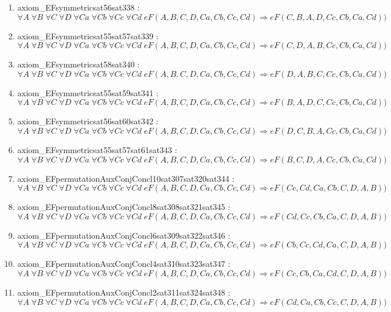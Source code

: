 \documentclass{article}
\begin{document}
\begin{enumerate}
\item axiom\_EFsymmetricsat56sat338 : $\forall A\;\forall B\;\forall C\;\forall D\;\forall Ca\;\forall Cb\;\forall Cc\;\forall Cd\;eF(A, B, C, D, Ca, Cb, Cc, Cd) \Rightarrow eF(C, B, A, D, Cc, Cb, Ca, Cd))$
\item axiom\_EFsymmetricsat55sat57sat339 : $\forall A\;\forall B\;\forall C\;\forall D\;\forall Ca\;\forall Cb\;\forall Cc\;\forall Cd\;eF(A, B, C, D, Ca, Cb, Cc, Cd) \Rightarrow eF(C, D, A, B, Cc, Cb, Ca, Cd))$
\item axiom\_EFsymmetricsat58sat340 : $\forall A\;\forall B\;\forall C\;\forall D\;\forall Ca\;\forall Cb\;\forall Cc\;\forall Cd\;eF(A, B, C, D, Ca, Cb, Cc, Cd) \Rightarrow eF(D, A, B, C, Cc, Cb, Ca, Cd))$
\item axiom\_EFsymmetricsat55sat59sat341 : $\forall A\;\forall B\;\forall C\;\forall D\;\forall Ca\;\forall Cb\;\forall Cc\;\forall Cd\;eF(A, B, C, D, Ca, Cb, Cc, Cd) \Rightarrow eF(B, A, D, C, Cc, Cb, Ca, Cd))$
\item axiom\_EFsymmetricsat56sat60sat342 : $\forall A\;\forall B\;\forall C\;\forall D\;\forall Ca\;\forall Cb\;\forall Cc\;\forall Cd\;eF(A, B, C, D, Ca, Cb, Cc, Cd) \Rightarrow eF(D, C, B, A, Cc, Cb, Ca, Cd))$
\item axiom\_EFsymmetricsat55sat57sat61sat343 : $\forall A\;\forall B\;\forall C\;\forall D\;\forall Ca\;\forall Cb\;\forall Cc\;\forall Cd\;eF(A, B, C, D, Ca, Cb, Cc, Cd) \Rightarrow eF(B, C, D, A, Cc, Cb, Ca, Cd))$
\item axiom\_EFpermutationAuxConjConcl10sat307sat320sat344 : $\forall A\;\forall B\;\forall C\;\forall D\;\forall Ca\;\forall Cb\;\forall Cc\;\forall Cd\;eF(A, B, C, D, Ca, Cb, Cc, Cd) \Rightarrow eF(Cc, Cd, Ca, Cb, C, D, A, B))$
\item axiom\_EFpermutationAuxConjConcl8sat308sat321sat345 : $\forall A\;\forall B\;\forall C\;\forall D\;\forall Ca\;\forall Cb\;\forall Cc\;\forall Cd\;eF(A, B, C, D, Ca, Cb, Cc, Cd) \Rightarrow eF(Cd, Cc, Cb, Ca, C, D, A, B))$
\item axiom\_EFpermutationAuxConjConcl6sat309sat322sat346 : $\forall A\;\forall B\;\forall C\;\forall D\;\forall Ca\;\forall Cb\;\forall Cc\;\forall Cd\;eF(A, B, C, D, Ca, Cb, Cc, Cd) \Rightarrow eF(Cb, Cc, Cd, Ca, C, D, A, B))$
\item axiom\_EFpermutationAuxConjConcl4sat310sat323sat347 : $\forall A\;\forall B\;\forall C\;\forall D\;\forall Ca\;\forall Cb\;\forall Cc\;\forall Cd\;eF(A, B, C, D, Ca, Cb, Cc, Cd) \Rightarrow eF(Cc, Cb, Ca, Cd, C, D, A, B))$
\item axiom\_EFpermutationAuxConjConcl2sat311sat324sat348 : $\forall A\;\forall B\;\forall C\;\forall D\;\forall Ca\;\forall Cb\;\forall Cc\;\forall Cd\;eF(A, B, C, D, Ca, Cb, Cc, Cd) \Rightarrow eF(Cd, Ca, Cb, Cc, C, D, A, B))$

\end{enumerate}
\end{document}
